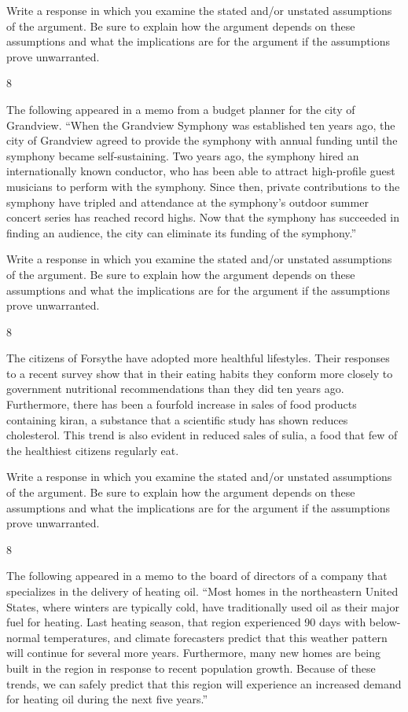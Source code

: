 \documentclass[]{article}
\begin{document}
Write a response in which you examine the stated and/or unstated
assumptions of the argument. Be sure to explain how the argument depends
on these assumptions and what the implications are for the argument if
the assumptions prove unwarranted.

8

The following appeared in a memo from a budget planner for the city of
Grandview. ``When the Grandview Symphony was established ten years ago,
the city of Grandview agreed to provide the symphony with annual funding
until the symphony became self-sustaining. Two years ago, the symphony
hired an internationally known conductor, who has been able to attract
high-profile guest musicians to perform with the symphony. Since then,
private contributions to the symphony have tripled and attendance at the
symphony's outdoor summer concert series has reached record highs. Now
that the symphony has succeeded in finding an audience, the city can
eliminate its funding of the symphony.''

Write a response in which you examine the stated and/or unstated
assumptions of the argument. Be sure to explain how the argument depends
on these assumptions and what the implications are for the argument if
the assumptions prove unwarranted.

8

The citizens of Forsythe have adopted more healthful lifestyles. Their
responses to a recent survey show that in their eating habits they
conform more closely to government nutritional recommendations than they
did ten years ago. Furthermore, there has been a fourfold increase in
sales of food products containing kiran, a substance that a scientific
study has shown reduces cholesterol. This trend is also evident in
reduced sales of sulia, a food that few of the healthiest citizens
regularly eat.

Write a response in which you examine the stated and/or unstated
assumptions of the argument. Be sure to explain how the argument depends
on these assumptions and what the implications are for the argument if
the assumptions prove unwarranted.

8

The following appeared in a memo to the board of directors of a company
that specializes in the delivery of heating oil. ``Most homes in the
northeastern United States, where winters are typically cold, have
traditionally used oil as their major fuel for heating. Last heating
season, that region experienced 90 days with below-normal temperatures,
and climate forecasters predict that this weather pattern will continue
for several more years. Furthermore, many new homes are being built in
the region in response to recent population growth. Because of these
trends, we can safely predict that this region will experience an
increased demand for heating oil during the next five years.''
\end{document}
